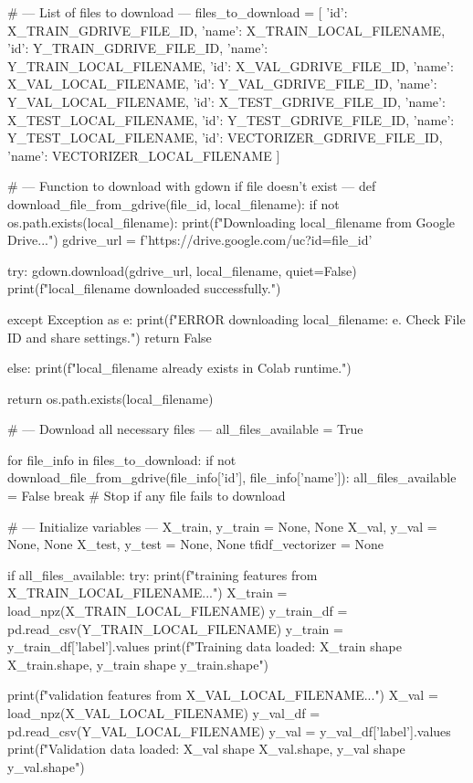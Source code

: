 \begin{ffcode}
# --- List of files to download ---
files_to_download = [
    {'id': X_TRAIN_GDRIVE_FILE_ID, 'name': X_TRAIN_LOCAL_FILENAME},
    {'id': Y_TRAIN_GDRIVE_FILE_ID, 'name': Y_TRAIN_LOCAL_FILENAME},
    {'id': X_VAL_GDRIVE_FILE_ID, 'name': X_VAL_LOCAL_FILENAME},
    {'id': Y_VAL_GDRIVE_FILE_ID, 'name': Y_VAL_LOCAL_FILENAME},
    {'id': X_TEST_GDRIVE_FILE_ID, 'name': X_TEST_LOCAL_FILENAME},
    {'id': Y_TEST_GDRIVE_FILE_ID, 'name': Y_TEST_LOCAL_FILENAME},
    {'id': VECTORIZER_GDRIVE_FILE_ID, 'name': VECTORIZER_LOCAL_FILENAME}
]

# --- Function to download with gdown if file doesn't exist ---
def download_file_from_gdrive(file_id, local_filename):
    if not os.path.exists(local_filename):
        print(f"Downloading {local_filename} from Google Drive...")
        gdrive_url = f'https://drive.google.com/uc?id={file_id}'

        try:
            gdown.download(gdrive_url, local_filename, quiet=False)
            print(f"{local_filename} downloaded successfully.")

        except Exception as e:
            print(f"ERROR downloading {local_filename}: {e}. Check File ID and share settings.")
            return False

    else:
        print(f"{local_filename} already exists in Colab runtime.")

    return os.path.exists(local_filename)

# --- Download all necessary files ---
all_files_available = True

for file_info in files_to_download:
    if not download_file_from_gdrive(file_info['id'], file_info['name']):
        all_files_available = False
        break # Stop if any file fails to download

# --- Initialize variables ---
X_train, y_train = None, None
X_val, y_val = None, None
X_test, y_test = None, None
tfidf_vectorizer = None

if all_files_available:
    try:
        print(f"\nLoading training features from {X_TRAIN_LOCAL_FILENAME}...")
        X_train = load_npz(X_TRAIN_LOCAL_FILENAME)
        y_train_df = pd.read_csv(Y_TRAIN_LOCAL_FILENAME)
        y_train = y_train_df['label'].values
        print(f"Training data loaded: X_train shape {X_train.shape}, y_train shape {y_train.shape}")

        print(f"\nLoading validation features from {X_VAL_LOCAL_FILENAME}...")
        X_val = load_npz(X_VAL_LOCAL_FILENAME)
        y_val_df = pd.read_csv(Y_VAL_LOCAL_FILENAME)
        y_val = y_val_df['label'].values
        print(f"Validation data loaded: X_val shape {X_val.shape}, y_val shape {y_val.shape}")


\end{ffcode}
